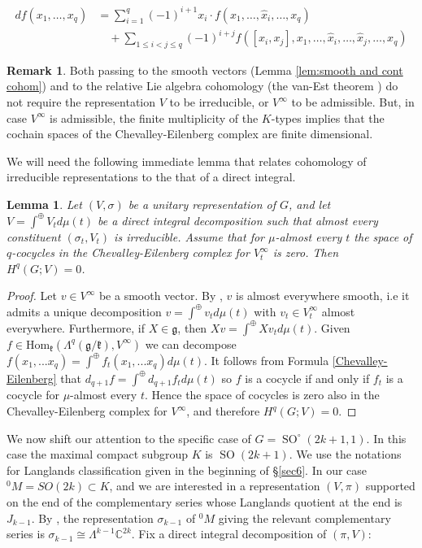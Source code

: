 \documentclass[12pt,reqno]{amsart}
\newcommand{\C}{\mathbb{C}}
\newtheorem{lemma}[theorem]{Lemma}
\theoremstyle{definition}
\newtheorem{remark}[theorem]{Remark}
\newcommand{\SO}{\operatorname{SO}}
\begin{document}
\begin{equation} \label{Chevalley-Eilenberg}
\begin{split}
    df(x_1, \dots, x_{q}) &= \sum_{i=1}^{q} (-1)^{i+1} x_i \cdot f(x_1, \dots, \hat{x}_i, \dots, x_q) \\
    &\quad + \sum_{1 \le i < j \le q} (-1)^{i+j} f([x_i, x_j], x_1, \dots, \hat{x}_i, \dots, \hat{x}_j, \dots, x_q)
\end{split}
\end{equation}

\begin{remark}
    Both passing to the smooth vectors (Lemma \ref{lem:smooth and cont cohom}) and to the relative Lie algebra cohomology (the van-Est theorem \cite[Theorem~3.2]{Kyed}) do not require the representation $V$ to be irreducible, or $V^\infty$ to be admissible. But, in case $V^\infty$ is admissible, the finite multiplicity of the $K$-types implies that the cochain spaces of the Chevalley-Eilenberg complex are finite dimensional.
\end{remark}
We will need the following immediate lemma that relates cohomology of irreducible representations to the that of a direct integral.
\begin{lemma}\label{lem:d=0 integral}
    Let $(V,\sigma)$ be a unitary representation of $G$, and let $V = \int^\oplus V_t d\mu(t)$ be a direct integral decomposition such that almost every constituent $(\sigma_t,V_t)$ is irreducible. Assume that for $\mu$-almost every $t$ the space of $q$-cocycles in the Chevalley-Eilenberg complex for $V_t^\infty$ is zero. Then $H^q(G;V)=0$.
\end{lemma}
\begin{proof}
    Let $v \in V^\infty$ be a smooth vector. By \cite[Lemma~2]{Arnal76}, $v$ is almost everywhere smooth, i.e it admits a unique decomposition $v = \int^\oplus v_t d\mu(t)$ with $v_t \in V_t^\infty$ almost everywhere. Furthermore, if $X \in \mathfrak{g}$, then $Xv = \int^\oplus Xv_t d\mu(t)$. Given $f \in \mathrm{Hom}_\mathfrak{k}(\Lambda^q (\mathfrak{g}/\mathfrak{k}), V^{\infty})$ we can decompose $f(x_1,...x_q) = \int^\oplus f_t(x_1,...x_q) d\mu(t)$. It follows from Formula \ref{Chevalley-Eilenberg}
    that $d_{q+1}f = \int^\oplus d_{q+1}f_t d\mu(t)$ so $f$ is a cocycle if and only if $f_t$ is a cocycle for $\mu$-almost every $t$. Hence the space of cocycles is zero also in the Chevalley-Eilenberg complex for $V^\infty$, and therefore $H^q(G;V)=0$.
\end{proof}
We now shift our attention to the specific case of $G = \SO^\circ(2k+1,1)$. In this case the maximal compact subgroup $K$ is $\SO(2k+1)$. We use the notations for Langlands classification given in the beginning of \S\ref{sec6}. In our case ${^0}M = SO(2k) \subset K$, and we are interested in a representation $(V,\pi)$ supported on the end of the complementary series whose Langlands quotient at the end is $J_{k-1}$. By \cite[Subsection~VI.4.2]{BorelWallach}, the representation $\sigma_{k-1}$ of ${^0}M$ giving the relevant complementary series is $\sigma_{k-1} \cong \Lambda^{k-1}\C^{2k}$. Fix a direct integral decomposition of $(\pi,V)$:
\end{document}
